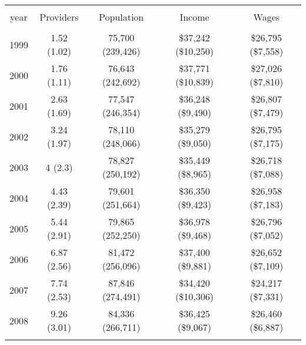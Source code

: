 
\begin{table}[!htbp] \centering 
  \caption{} 
  \label{} 
\begin{tabular}{@{\extracolsep{5pt}} ccccc} 
\\[-1.8ex]\hline 
\hline \\[-1.8ex] 
year & Providers & Population & Income & Wages \\ 
\hline \\[-1.8ex] 
1999 & 1.52 (1.02) & 75,700 (239,426) & \$37,242 (\$10,250) & \$26,795 (\$7,558) \\ 
2000 & 1.76 (1.11) & 76,643 (242,692) & \$37,771 (\$10,839) & \$27,026 (\$7,810) \\ 
2001 & 2.63 (1.69) & 77,547 (246,354) & \$36,248 (\$9,490) & \$26,807 (\$7,479) \\ 
2002 & 3.24 (1.97) & 78,110 (248,066) & \$35,279 (\$9,050) & \$26,795 (\$7,175) \\ 
2003 & 4 (2.3) & 78,827 (250,192) & \$35,449 (\$8,965) & \$26,718 (\$7,088) \\ 
2004 & 4.43 (2.39) & 79,601 (251,664) & \$36,350 (\$9,423) & \$26,958 (\$7,183) \\ 
2005 & 5.44 (2.91) & 79,865 (252,250) & \$36,978 (\$9,468) & \$26,796 (\$7,052) \\ 
2006 & 6.87 (2.56) & 81,472 (256,096) & \$37,400 (\$9,881) & \$26,652 (\$7,109) \\ 
2007 & 7.74 (2.53) & 87,846 (274,491) & \$34,420 (\$10,306) & \$24,217 (\$7,331) \\ 
2008 & 9.26 (3.01) & 84,336 (266,711) & \$36,425 (\$9,067) & \$26,460 (\$6,887) \\ 
\hline \\[-1.8ex] 
\end{tabular} 
\end{table} 
